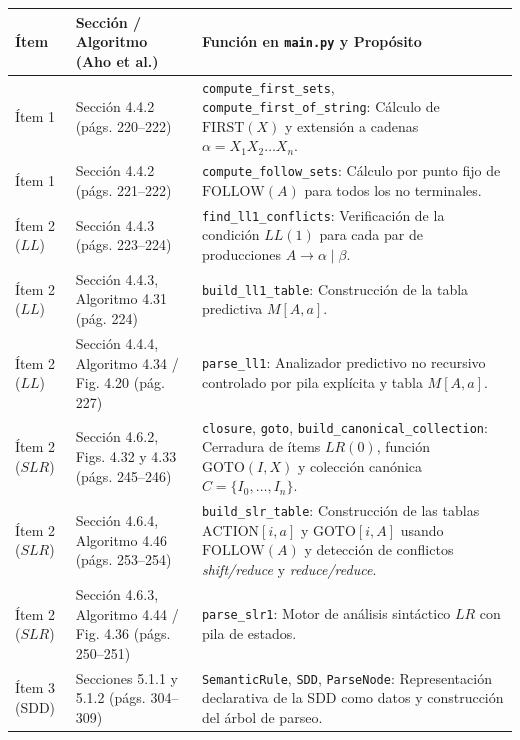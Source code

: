 \documentclass[11pt,a4paper]{article}
\begin{document}
\begin{table}[htbp]
\centering
\small
\setlength{\tabcolsep}{5pt}
\begin{tabular}{@{}>{\raggedright\arraybackslash}p{1.8cm}>{\raggedright\arraybackslash}p{4.3cm}>{\raggedright\arraybackslash}p{9.2cm}@{}}
\toprule
\textbf{\'Item} & \textbf{Secci\'on / Algoritmo (Aho et al.)} & \textbf{Funci\'on en \texttt{main.py} y Prop\'osito} \\
\midrule
\'Item 1 & Secci\'on 4.4.2 (p\'ags. 220--222) & \texttt{compute\_first\_sets}, \texttt{compute\_first\_of\_string}: C\'alculo de $\text{FIRST}(X)$ y extensi\'on a cadenas $\alpha = X_1 X_2 \dots X_n$. \\
\addlinespace[3pt]
\'Item 1 & Secci\'on 4.4.2 (p\'ags. 221--222) & \texttt{compute\_follow\_sets}: C\'alculo por punto fijo de $\text{FOLLOW}(A)$ para todos los no terminales. \\
\addlinespace[3pt]
\'Item 2 ($LL$) & Secci\'on 4.4.3 (p\'ags. 223--224) & \texttt{find\_ll1\_conflicts}: Verificaci\'on de la condici\'on $LL(1)$ para cada par de producciones $A \to \alpha \mid \beta$. \\
\addlinespace[3pt]
\'Item 2 ($LL$) & Secci\'on 4.4.3, Algoritmo 4.31 (p\'ag. 224) & \texttt{build\_ll1\_table}: Construcci\'on de la tabla predictiva $M[A,a]$. \\
\addlinespace[3pt]
\'Item 2 ($LL$) & Secci\'on 4.4.4, Algoritmo 4.34 / Fig. 4.20 (p\'ag. 227) & \texttt{parse\_ll1}: Analizador predictivo no recursivo controlado por pila expl\'icita y tabla $M[A,a]$. \\
\addlinespace[3pt]
\'Item 2 ($SLR$) & Secci\'on 4.6.2, Figs. 4.32 y 4.33 (p\'ags. 245--246) & \texttt{closure}, \texttt{goto}, \texttt{build\_canonical\_collection}: Cerradura de \'items $LR(0)$, funci\'on $\text{GOTO}(I,X)$ y colecci\'on can\'onica $C = \{I_0, \dots, I_n\}$. \\
\addlinespace[3pt]
\'Item 2 ($SLR$) & Secci\'on 4.6.4, Algoritmo 4.46 (p\'ags. 253--254) & \texttt{build\_slr\_table}: Construcci\'on de las tablas $\text{ACTION}[i,a]$ y $\text{GOTO}[i,A]$ usando $\text{FOLLOW}(A)$ y detecci\'on de conflictos \textit{shift/reduce} y \textit{reduce/reduce}. \\
\addlinespace[3pt]
\'Item 2 ($SLR$) & Secci\'on 4.6.3, Algoritmo 4.44 / Fig. 4.36 (p\'ags. 250--251) & \texttt{parse\_slr1}: Motor de an\'alisis sint\'actico $LR$ con pila de estados. \\
\addlinespace[3pt]
\'Item 3 (SDD) & Secciones 5.1.1 y 5.1.2 (p\'ags. 304--309) & \texttt{SemanticRule}, \texttt{SDD}, \texttt{ParseNode}: Representaci\'on declarativa de la SDD como datos y construcci\'on del \'arbol de parseo. \\

\end{tabular}
\end{table}
\end{document}
